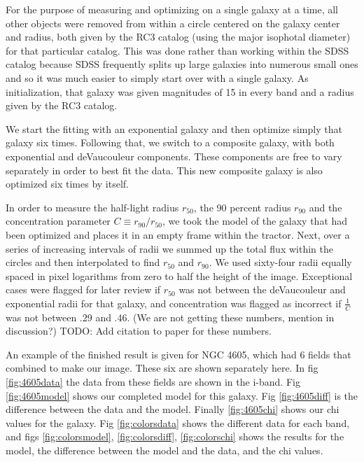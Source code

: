 \documentclass[12pt,preprint,pdftex]{aastex}
\newcommand{\rfifty}{r_{50}}
\newcommand{\rninety}{r_{90}}
\newcommand{\conc}{C}
\begin{document}
For the purpose of measuring and optimizing on a single galaxy at a
time, all other objects were removed from within a circle centered on
the galaxy center and radius, both given by the RC3 catalog (using the major isophotal diameter)
 for that particular catalog. This was done rather than
working within the SDSS catalog because SDSS frequently splits up large
galaxies into numerous small ones and so it was much easier to simply
start over with a single galaxy. As initialization, that galaxy was
given magnitudes of 15 in every band and a radius given by the RC3
catalog.


We start the fitting with an exponential galaxy and then optimize
simply that galaxy six times. Following that, we switch to a composite
galaxy, with both exponential and deVaucouleur components. These
components are free to vary separately in order to best fit the
data. This new composite galaxy is also optimized six times by itself.

In order to measure the half-light radius $\rfifty$, the 90 percent
radius $\rninety$ and the concentration parameter $\conc\equiv
\rninety/\rfifty$, we took the model of the galaxy that had been
optimized and places it in an empty frame within the tractor. Next,
over a series of increasing intervals of radii we summed up the total
flux within the circles and then interpolated to find $\rfifty$ and $\rninety$.
 We used sixty-four radii equally spaced in pixel logarithms from zero
 to half the height of the image. Exceptional cases were flagged for later
 review if $\rfifty$ was not between the deVaucouleur and exponential radii
 for that galaxy, and concentration was flagged as incorrect if $\frac{1}{\conc}$
 was not between .29 and .46. (We are not getting these numbers, mention in
 discussion?) TODO: Add citation to paper for these numbers.

An example of the finished result is given for NGC 4605, which had 6 fields that combined to make our image. These six are shown separately here. In fig \ref{fig:4605data} the data from these fields are shown in the i-band. Fig \ref{fig:4605model} shows our completed model for this galaxy. Fig \ref{fig:4605diff} is the difference between the data and the model. Finally \ref{fig:4605chi} shows our chi values for the galaxy. Fig \ref{fig:colorsdata} shows the different data for each band, and figs \ref{fig:colorsmodel}, \ref{fig:colorsdiff}, \ref{fig:colorschi} shows the results for the model, the difference between the model and the data, and the chi values.
\end{document}
